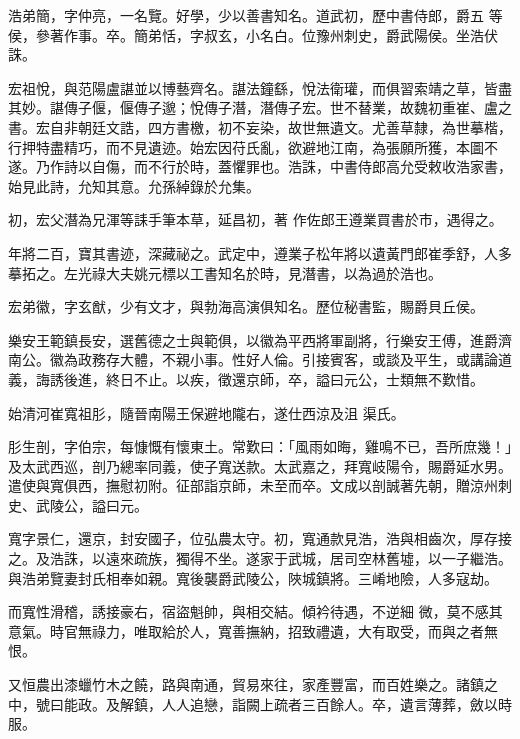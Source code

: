\begin{pinyinscope}
 浩弟簡，字仲亮，一名覽。好學，少以善書知名。道武初，歷中書侍郎，爵五
 等侯，參著作事。卒。簡弟恬，字叔玄，小名白。位豫州刺史，爵武陽侯。坐浩伏誅。



 宏祖悅，與范陽盧諶並以博藝齊名。諶法鐘繇，悅法衛瓘，而俱習索靖之草，皆盡其妙。諶傳子偃，偃傳子邈；悅傳子潛，潛傳子宏。世不替業，故魏初重崔、盧之書。宏自非朝廷文誥，四方書檄，初不妄染，故世無遺文。尤善草隸，為世摹楷，行押特盡精巧，而不見遺迹。始宏因苻氏亂，欲避地江南，為張願所獲，本圖不遂。乃作詩以自傷，而不行於時，蓋懼罪也。浩誅，中書侍郎高允受敕收浩家書，始見此詩，允知其意。允孫綽錄於允集。



 初，宏父潛為兄渾等誄手筆本草，延昌初，著
 作佐郎王遵業買書於市，遇得之。



 年將二百，寶其書迹，深藏祕之。武定中，遵業子松年將以遺黃門郎崔季舒，人多摹拓之。左光祿大夫姚元標以工書知名於時，見潛書，以為過於浩也。



 宏弟徽，字玄猷，少有文才，與勃海高演俱知名。歷位秘書監，賜爵貝丘侯。



 樂安王範鎮長安，選舊德之士與範俱，以徽為平西將軍副將，行樂安王傅，進爵濟南公。徽為政務存大體，不親小事。性好人倫。引接賓客，或談及平生，或講論道義，誨誘後進，終日不止。以疾，徵還京師，卒，謚曰元公，士類無不歎惜。



 始清河崔寬祖肜，隨晉南陽王保避地隴右，遂仕西涼及沮
 渠氏。



 肜生剖，字伯宗，每慷慨有懷東土。常歎曰：「風雨如晦，雞鳴不已，吾所庶幾！」及太武西巡，剖乃總率同義，使子寬送款。太武嘉之，拜寬岐陽令，賜爵延水男。遣使與寬俱西，撫慰初附。征部詣京師，未至而卒。文成以剖誠著先朝，贈涼州刺史、武陵公，謚曰元。



 寬字景仁，還京，封安國子，位弘農太守。初，寬通款見浩，浩與相齒次，厚存接之。及浩誅，以遠來疏族，獨得不坐。遂家于武城，居司空林舊墟，以一子繼浩。與浩弟覽妻封氏相奉如親。寬後襲爵武陵公，陜城鎮將。三崤地險，人多寇劫。



 而寬性滑稽，誘接豪右，宿盜魁帥，與相交結。傾衿待遇，不逆細
 微，莫不感其意氣。時官無祿力，唯取給於人，寬善撫納，招致禮遺，大有取受，而與之者無恨。



 又恒農出漆蠟竹木之饒，路與南通，貿易來往，家產豐富，而百姓樂之。諸鎮之中，號曰能政。及解鎮，人人追戀，詣闕上疏者三百餘人。卒，遺言薄葬，斂以時服。




\end{pinyinscope}
